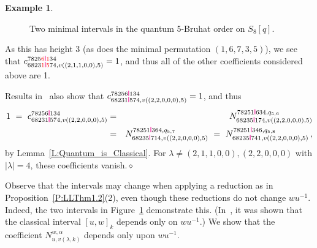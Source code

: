 \documentclass[12pt,oneside,reqno]{amsart}
\theoremstyle{definition}
\newtheorem{example}[theorem]{Example}
\numberwithin{equation}{section}
\newcommand{\ptsp}{\hspace{0.55pt}}
\newcommand{\pp}{\raisebox{-0.3pt}{\ptsp\color{magenta}\rule{0.75pt}{6pt}}\ptsp}  %
\newcommand{\rc}[1]{{\color{red}#1}}
\begin{document}
\begin{example}
\begin{figure}[htb]
 \caption{Two minimal intervals in the quantum 5-Bruhat order on $S_8[q]$.}
  \label{F:qminimal}
\end{figure}


As this has height 3 (as does the minimal permutation $(1,6,7,3,5)$), we see that \newline
$c^{7825\rc{6\pp1}34}_{6823\rc{1\pp5}74, v((2,1,1,0,0),5)}=1$, and thus all of the other coefficients considered above are 1.

Results in~\cite{BS-Bruhat} also show that $c^{78256\pp134}_{68231\pp574, v((2,2,0,0,0),5)}=1$, and thus
%
 \begin{eqnarray*}
    1\ =\ c^{78256\pp134}_{68231\pp574, v((2,2,0,0,0),5)}
    &=&  N^{78251\pp634, q_{5,6}}_{68235\pp174, v((2,2,0,0,0),5)}\\
    &=&  N^{78251\pp364, q_{5,7}}_{68235\pp714, v((2,2,0,0,0),5)}
    \ =\ N^{78251\pp346, q_{5,8}}_{68235\pp741, v((2,2,0,0,0),5)}\,,
 \end{eqnarray*}
%
by Lemma~\ref{L:Quantum_is_Classical}.
For $\lambda\neq(2,1,1,0,0), (2,2,0,0,0)$ with $|\lambda|=4$, these coefficients vanish.\hfill$\diamond$ 
\end{example}

Observe that the intervals may change when applying a reduction as in Proposition~\ref{P:LLThm1.2}(2), even though these
reductions do not change $wu^{-1}$.
Indeed, the two intervals in Figure~\ref{F:qminimal} demonstrate this.
(In~\cite{BS-Bruhat}, it was shown that the classical interval $[u,w]_k$ depends only on $wu^{-1}$.)
We show that the coefficient $N^{w,\alpha}_{u,v(\lambda,k)}$ depends only upon $wu^{-1}$.
\end{document}
